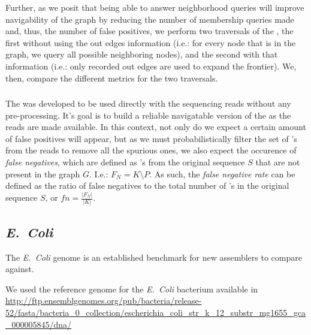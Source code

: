
Further, as we posit that being able to answer neighborhood queries will improve navigability of the graph by reducing the number of
membership queries made and, thus, the number of false positives, we perform two traversals of the \dBG, the first without using the
out edges information (i.e.: for every node that is in the graph, we query all possible neighboring nodes), and the second with that
information (i.e.: only recorded out edges are used to expand the frontier). We, then, compare the different metrics for the two
traversals.

\subsubsection{\dBCM}

The \dBCM was developed to be used directly with the sequencing reads without any pre-processing. It's goal is to build a reliable
navigatable version of the \dBG as the reads are made available. In this context, not only do we expect a certain amount of false
positives will appear, but as we must probabilistically filter the set of \kmer's from the reads to remove all the spurious ones, we
also expect the occurence of \emph{false negatives}, which are defined as \kmer's from the original sequence $S$ that are not present
in the graph $G$. I.e.: $F_N=K \setminus P$. As such, the \emph{false negative rate} can be defined as the ratio of false negatives
to the total number of \kmer's in the original sequence $S$, or $fn=\frac{|F_N|}{|K|}$.

\subsubsection{\dBHT}

\subsection{\emph{E.~Coli}}

The \emph{E.~Coli} genome is an established benchmark for new assemblers to compare against.

We used the reference genome for the \emph{E.~Coli} bacterium available in \url{http://ftp.ensemblgenomes.org/pub/bacteria/release-52/fasta/bacteria_0_collection/escherichia_coli_str_k_12_substr_mg1655_gca_000005845/dna/}

